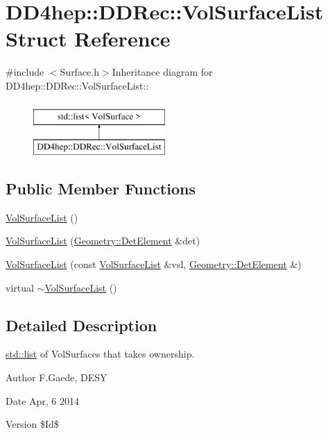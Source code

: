 \hypertarget{struct_d_d4hep_1_1_d_d_rec_1_1_vol_surface_list}{
\section{DD4hep::DDRec::VolSurfaceList Struct Reference}
\label{struct_d_d4hep_1_1_d_d_rec_1_1_vol_surface_list}
}


{\ttfamily \#include $<$Surface.h$>$}Inheritance diagram for DD4hep::DDRec::VolSurfaceList::\begin{figure}[H]
\begin{center}
\leavevmode
\includegraphics[height=2cm]{struct_d_d4hep_1_1_d_d_rec_1_1_vol_surface_list}
\end{center}
\end{figure}
\subsection*{Public Member Functions}
\begin{DoxyCompactItemize}
\item 
\hyperlink{struct_d_d4hep_1_1_d_d_rec_1_1_vol_surface_list_a507b0bd784bd76bd7db0f321cbeb32cc}{VolSurfaceList} ()
\item 
\hyperlink{struct_d_d4hep_1_1_d_d_rec_1_1_vol_surface_list_a0a770b1964232e22b98bb900bdb785f5}{VolSurfaceList} (\hyperlink{class_d_d4hep_1_1_geometry_1_1_det_element}{Geometry::DetElement} \&det)
\item 
\hyperlink{struct_d_d4hep_1_1_d_d_rec_1_1_vol_surface_list_a131b4d74516cb38d5dbc8192c89a03df}{VolSurfaceList} (const \hyperlink{struct_d_d4hep_1_1_d_d_rec_1_1_vol_surface_list}{VolSurfaceList} \&vsl, \hyperlink{class_d_d4hep_1_1_geometry_1_1_det_element}{Geometry::DetElement} \&)
\item 
virtual \hyperlink{struct_d_d4hep_1_1_d_d_rec_1_1_vol_surface_list_a7729277c83e494f147f21166220debd0}{$\sim$VolSurfaceList} ()
\end{DoxyCompactItemize}


\subsection{Detailed Description}
\hyperlink{classstd_1_1list}{std::list} of VolSurfaces that takes ownership. \begin{DoxyAuthor}{Author}
F.Gaede, DESY 
\end{DoxyAuthor}
\begin{DoxyDate}{Date}
Apr, 6 2014 
\end{DoxyDate}
\begin{DoxyVersion}{Version}
\$Id\$ 
\end{DoxyVersion}


